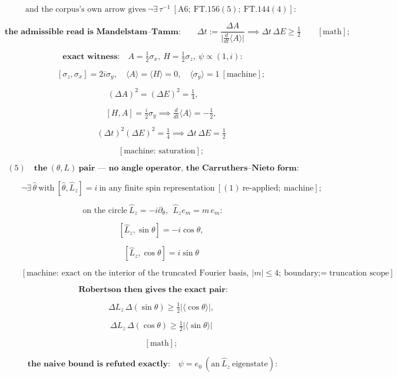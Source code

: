 \documentclass[11pt,openany]{report}
\theoremstyle{canonplain}
\theoremstyle{canondef}
\begin{document}
\[
\qquad \text{and the corpus's own arrow gives}\ \neg\exists\,\tau^{-1}\ [\mathrm{A6};\ \mathrm{FT.156}(5);\ \mathrm{FT.144}(4)]:
\]

\[
\textbf{the admissible read is Mandelstam–Tamm:}\qquad\Delta t:=\frac{\Delta A}{\bigl|\tfrac{d}{dt}\langle A\rangle\bigr|}\implies\Delta t\,\Delta E\ge\tfrac12\qquad[\text{math}];
\]

\[
\textbf{exact witness:}\quad A=\tfrac12\sigma_x,\ H=\tfrac12\sigma_z,\ \psi\propto(1,i):
\]

\[
\qquad [\sigma_z,\sigma_x]=2i\sigma_y,\quad\langle A\rangle=\langle H\rangle=0,\quad\langle\sigma_y\rangle=1\ [\text{machine}];
\]

\[
(\Delta A)^2=(\Delta E)^2=\tfrac14,
\]

\[
\qquad [H,A]=\tfrac i2\sigma_y\implies\tfrac{d}{dt}\langle A\rangle=-\tfrac12,
\]

\[
\qquad (\Delta t)^2(\Delta E)^2=\tfrac14\implies\Delta t\,\Delta E=\tfrac12
\]

\[
\qquad [\text{machine: saturation}];
\]

\[
(5)\quad\textbf{the}\ (\theta,L)\ \textbf{pair — no angle operator, the Carruthers–Nieto form:}
\]

\[
\qquad \neg\exists\,\hat\theta\ \text{with}\ [\hat\theta,\hat L_z]=i\ \text{in any finite spin representation}\ [(1)\ \text{re-applied};\ \text{machine}];
\]

\[
\text{on the circle}\ \hat L_z=-i\partial_\theta,\ \ \hat L_z e_m=m\,e_m:
\]

\[
\qquad [\hat L_z,\sin\theta]=-i\cos\theta,
\]

\[
\qquad [\hat L_z,\cos\theta]=i\sin\theta
\]

\[
\qquad [\text{machine: exact on the interior of the truncated Fourier basis},\ |m|\le4;\ \text{boundary}=\text{truncation scope}];
\]

\[
\textbf{Robertson then gives the exact pair:}
\]

\[
\qquad \Delta L_z\,\Delta(\sin\theta)\ge\tfrac12|\langle\cos\theta\rangle|,
\]

\[
\qquad \Delta L_z\,\Delta(\cos\theta)\ge\tfrac12|\langle\sin\theta\rangle|
\]

\[
\qquad [\text{math}];
\]

\[
\textbf{the naive bound is refuted exactly:}\quad\psi=e_0\ (\text{an}\ \hat L_z\ \text{eigenstate}):
\]
\end{document}

